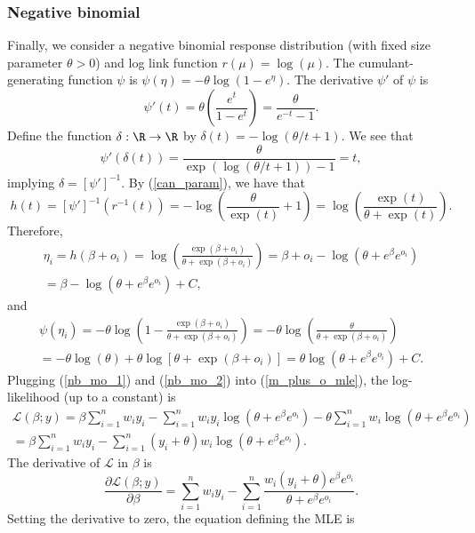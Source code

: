 \documentclass[12pt]{article}
\begin{document}
\begin{appendices}
\subsubsection*{Negative binomial}
Finally, we consider a negative binomial response distribution (with fixed size parameter $\theta > 0$) and log link function $r(\mu) = \log(\mu)$. The cumulant-generating function $\psi$ is
$\psi(\eta) = -\theta \log(1 - e^\eta).$ The derivative $\psi'$ of $\psi$ is
$$ \psi'(t) = \theta \left(\frac{e^t}{1 - e^t}\right) = \frac{\theta}{e^{-t} - 1}.$$ Define the function $\delta: \R \to \R$ by $\delta(t) = -\log\left(\theta/t + 1 \right).$ We see that
$$\psi'(\delta(t)) = \frac{\theta}{\exp\left(\log(\theta/t + 1 )\right) - 1} = t,$$ implying $\delta = [\psi']^{-1}.$ By (\ref{can_param}), we have that
$$
h(t) = [\psi']^{-1}(r^{-1}(t)) = -\log\left(\frac{\theta}{\exp(t)} + 1 \right) = \log\left(\frac{\exp(t)}{\theta + \exp(t)}\right).
$$
Therefore,
\begin{multline}\label{nb_mo_1}
\eta_i = h(\beta + o_i) = \log\left(\frac{\exp(\beta+o_i)}{\theta + \exp(\beta + o_i)} \right) = \beta + o_i - \log\left(\theta + e^{\beta}e^{o_i}\right) \\ = \beta - \log\left(\theta + e^{\beta}e^{o_i} \right) + C,
\end{multline}
 and
 \begin{multline}\label{nb_mo_2}
 \psi(\eta_i) = -\theta\log\left(1 - \frac{\exp(\beta+o_i)}{\theta + \exp(\beta + o_i)} \right) = -\theta \log \left(\frac{\theta}{\theta + \exp(\beta + o_i)} \right) \\ = -\theta \log (\theta) + \theta \log[\theta + \exp(\beta + o_i)] = \theta \log(\theta + e^{\beta}e^{o_i}) + C.
 \end{multline}
 Plugging (\ref{nb_mo_1}) and (\ref{nb_mo_2}) into (\ref{m_plus_o_mle}), the log-likelihood (up to a constant) is
\begin{multline*}
\mathcal{L}(\beta; y) = \beta \sum_{i=1}^n w_i y_i - \sum_{i=1}^n w_i y_i \log(\theta + e^\beta e^{o_i}) - \theta \sum_{i=1}^n w_i \log(\theta + e^\beta  e^{o_i}) \\ = \beta \sum_{i=1}^n w_i y_i - \sum_{i=1}^n (y_i + \theta)w_i\log(\theta + e^\beta e^{o_i}).
\end{multline*}
The derivative of $\mathcal{L}$ in $\beta$ is
$$\frac{\partial \mathcal{L}(\beta;y)}{\partial \beta} = \sum_{i=1}^n w_i y_i  - \sum_{i=1}^n \frac{w_i(y_i + \theta) e^{\beta} e^{o_i}}{ \theta + e^{\beta} e^{o_i}}.$$
Setting the derivative to zero, the equation defining the MLE is
\begin{equation}\label{nb_mle}

\end{equation}
\end{appendices}
\end{document}
